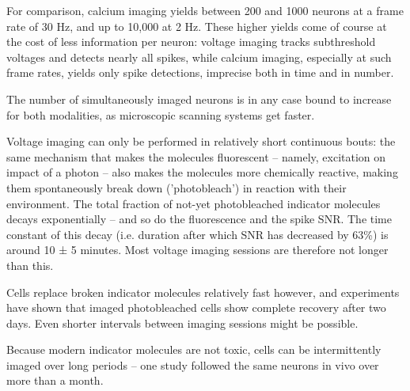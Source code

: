 For comparison, calcium imaging yields between 200 and 1000 neurons at a frame rate of 30 Hz, and up to 10,000 at 2 Hz.\cite{Pachitariu2017Suite2p10000} These higher yields come of course at the cost of less information per neuron: voltage imaging tracks subthreshold voltages and detects nearly all spikes, while calcium imaging, especially at such frame rates, yields only spike detections, imprecise both in time and in number.

The number of simultaneously imaged neurons is in any case bound to increase for both modalities, as microscopic scanning systems get faster.

Voltage imaging can only be performed in relatively short continuous bouts: the same mechanism that makes the molecules fluorescent -- namely, excitation on impact of a photon -- also makes the molecules more chemically reactive, making them spontaneously break down ('photobleach') in reaction with their environment. The total fraction of not-yet photobleached indicator molecules decays exponentially -- and so do the fluorescence and the spike SNR. The time constant of this decay (i.e. duration after which SNR has decreased by 63\%) is around 10 ± 5 minutes.\cite{Piatkevich2019PopulationImagingNeural,Abdelfattah2019BrightPhotostableChemigenetic} Most voltage imaging sessions are therefore not longer than this.

Cells replace broken indicator molecules relatively fast however, and experiments have shown that imaged photobleached cells show complete recovery after two days. Even shorter intervals between imaging sessions might be possible.

Because modern indicator molecules are not toxic, cells can be intermittently imaged over long periods -- one study followed the same neurons in vivo over more than a month.
